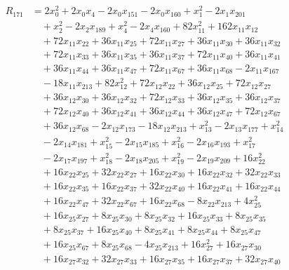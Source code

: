 \begin{align*}
R_{171} &= 2 x_{0}^{2} +2 x_{0} x_{4} -2 x_{0} x_{151} -2 x_{0} x_{160} +x_{1}^{2} -2 x_{1} x_{201} \\
&\quad +x_{2}^{2} -2 x_{2} x_{189} +x_{4}^{2} -2 x_{4} x_{160} +82 x_{11}^{2} +162 x_{11} x_{12} \\
&\quad +72 x_{11} x_{22} +36 x_{11} x_{25} +72 x_{11} x_{27} +36 x_{11} x_{30} +36 x_{11} x_{32} \\
&\quad +72 x_{11} x_{33} +36 x_{11} x_{35} +36 x_{11} x_{37} +72 x_{11} x_{40} +36 x_{11} x_{41} \\
&\quad +36 x_{11} x_{44} +36 x_{11} x_{47} +72 x_{11} x_{67} +36 x_{11} x_{68} -2 x_{11} x_{167} \\
&\quad -18 x_{11} x_{213} +82 x_{12}^{2} +72 x_{12} x_{22} +36 x_{12} x_{25} +72 x_{12} x_{27} \\
&\quad +36 x_{12} x_{30} +36 x_{12} x_{32} +72 x_{12} x_{33} +36 x_{12} x_{35} +36 x_{12} x_{37} \\
&\quad +72 x_{12} x_{40} +36 x_{12} x_{41} +36 x_{12} x_{44} +36 x_{12} x_{47} +72 x_{12} x_{67} \\
&\quad +36 x_{12} x_{68} -2 x_{12} x_{173} -18 x_{12} x_{213} +x_{13}^{2} -2 x_{13} x_{177} +x_{14}^{2} \\
&\quad -2 x_{14} x_{181} +x_{15}^{2} -2 x_{15} x_{185} +x_{16}^{2} -2 x_{16} x_{193} +x_{17}^{2} \\
&\quad -2 x_{17} x_{197} +x_{18}^{2} -2 x_{18} x_{205} +x_{19}^{2} -2 x_{19} x_{209} +16 x_{22}^{2} \\
&\quad +16 x_{22} x_{25} +32 x_{22} x_{27} +16 x_{22} x_{30} +16 x_{22} x_{32} +32 x_{22} x_{33} \\
&\quad +16 x_{22} x_{35} +16 x_{22} x_{37} +32 x_{22} x_{40} +16 x_{22} x_{41} +16 x_{22} x_{44} \\
&\quad +16 x_{22} x_{47} +32 x_{22} x_{67} +16 x_{22} x_{68} -8 x_{22} x_{213} +4 x_{25}^{2} \\
&\quad +16 x_{25} x_{27} +8 x_{25} x_{30} +8 x_{25} x_{32} +16 x_{25} x_{33} +8 x_{25} x_{35} \\
&\quad +8 x_{25} x_{37} +16 x_{25} x_{40} +8 x_{25} x_{41} +8 x_{25} x_{44} +8 x_{25} x_{47} \\
&\quad +16 x_{25} x_{67} +8 x_{25} x_{68} -4 x_{25} x_{213} +16 x_{27}^{2} +16 x_{27} x_{30} \\
&\quad +16 x_{27} x_{32} +32 x_{27} x_{33} +16 x_{27} x_{35} +16 x_{27} x_{37} +32 x_{27} x_{40} \\

\end{align*}
